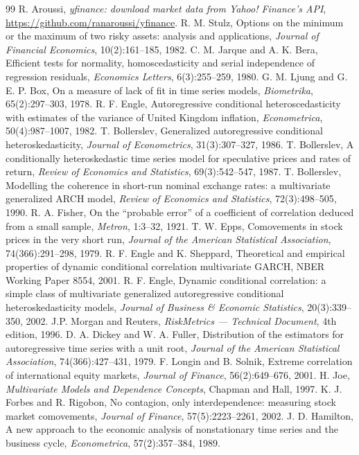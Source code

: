 \documentclass[11pt,a4paper]{article}
\begin{document}
\begin{thebibliography}{99}
 R. Aroussi, \emph{yfinance: download market data from Yahoo! Finance's API},
\url{https://github.com/ranaroussi/yfinance}.
 R. M. Stulz, Options on the minimum or the maximum of two risky assets: analysis and
applications, \emph{Journal of Financial Economics}, 10(2):161--185, 1982.
 C. M. Jarque and A. K. Bera, Efficient tests for normality, homoscedasticity and serial
independence of regression residuals, \emph{Economics Letters}, 6(3):255--259, 1980.
 G. M. Ljung and G. E. P. Box, On a measure of lack of fit in time series models,
\emph{Biometrika}, 65(2):297--303, 1978.
 R. F. Engle, Autoregressive conditional heteroscedasticity with estimates of the variance of
United Kingdom inflation, \emph{Econometrica}, 50(4):987--1007, 1982.
 T. Bollerslev, Generalized autoregressive conditional heteroskedasticity, \emph{Journal of
Econometrics}, 31(3):307--327, 1986.
 T. Bollerslev, A conditionally heteroskedastic time series model for speculative prices and
rates of return, \emph{Review of Economics and Statistics}, 69(3):542--547, 1987.
 T. Bollerslev, Modelling the coherence in short-run nominal exchange rates: a multivariate
generalized ARCH model, \emph{Review of Economics and Statistics}, 72(3):498--505, 1990.
 R. A. Fisher, On the ``probable error'' of a coefficient of correlation deduced from a small
sample, \emph{Metron}, 1:3--32, 1921.
 T. W. Epps, Comovements in stock prices in the very short run, \emph{Journal of the American
Statistical Association}, 74(366):291--298, 1979.
 R. F. Engle and K. Sheppard, Theoretical and empirical properties of dynamic conditional
correlation multivariate GARCH, NBER Working Paper 8554, 2001.
 R. F. Engle, Dynamic conditional correlation: a simple class of multivariate generalized
autoregressive conditional heteroskedasticity models, \emph{Journal of Business \& Economic Statistics},
20(3):339--350, 2002.
 J.P. Morgan and Reuters, \emph{RiskMetrics --- Technical Document}, 4th edition, 1996.
 D. A. Dickey and W. A. Fuller, Distribution of the estimators for autoregressive time
series with a unit root, \emph{Journal of the American Statistical Association}, 74(366):427--431, 1979.
 F. Longin and B. Solnik, Extreme correlation of international equity markets,
\emph{Journal of Finance}, 56(2):649--676, 2001.
 H. Joe, \emph{Multivariate Models and Dependence Concepts}, Chapman and Hall, 1997.
 K. J. Forbes and R. Rigobon, No contagion, only interdependence: measuring stock market
comovements, \emph{Journal of Finance}, 57(5):2223--2261, 2002.
 J. D. Hamilton, A new approach to the economic analysis of nonstationary time series and the
business cycle, \emph{Econometrica}, 57(2):357--384, 1989.
\end{thebibliography}
\end{document}
